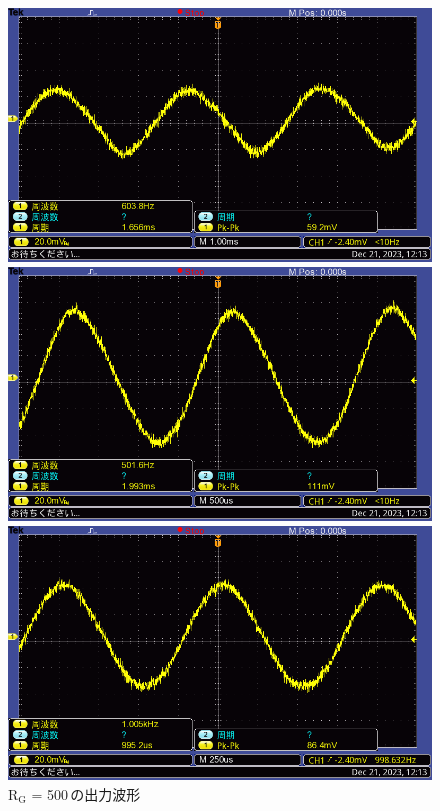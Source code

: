 \documentclass{ltjsarticle}
\begin{document}
\begin{figure}[H]
\begin{minipage}{0.4\columnwidth}
			\centering
			\includegraphics[width = \columnwidth]{figs/F0013TEK.PNG}
			\end{minipage}
			\hspace{0.04\columnwidth}
			\begin{minipage}{0.4\columnwidth}
			\centering
			\includegraphics[width = \columnwidth]{figs/F0014TEK.PNG}
			\end{minipage}
			\hspace{0.04\columnwidth}
			\begin{minipage}{0.4\columnwidth}
			\centering
			\includegraphics[width = \columnwidth]{figs/F0015TEK.PNG}
			\end{minipage}
			\caption{$\mathrm{R_G}$ = 500\,\Omega の出力波形}
			\label{fig:week5-1-500}
			\end{figure}
\end{document}
